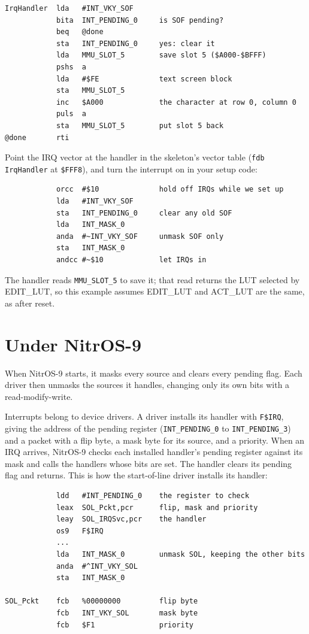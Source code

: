 \begin{verbatim}
IrqHandler  lda   #INT_VKY_SOF
            bita  INT_PENDING_0     is SOF pending?
            beq   @done
            sta   INT_PENDING_0     yes: clear it
            lda   MMU_SLOT_5        save slot 5 ($A000-$BFFF)
            pshs  a
            lda   #$FE              text screen block
            sta   MMU_SLOT_5
            inc   $A000             the character at row 0, column 0
            puls  a
            sta   MMU_SLOT_5        put slot 5 back
@done       rti
\end{verbatim}

Point the IRQ vector at the handler in the skeleton's vector table (\verb+fdb IrqHandler+ at \verb+$FFF8+), and turn the interrupt on in your setup code:

\begin{verbatim}
            orcc  #$10              hold off IRQs while we set up
            lda   #INT_VKY_SOF
            sta   INT_PENDING_0     clear any old SOF
            lda   INT_MASK_0
            anda  #~INT_VKY_SOF     unmask SOF only
            sta   INT_MASK_0
            andcc #~$10             let IRQs in
\end{verbatim}

The handler reads \verb+MMU_SLOT_5+ to save it; that read returns the LUT selected by EDIT\_LUT, so this example assumes EDIT\_LUT and ACT\_LUT are the same, as after reset.

\section{Under NitrOS-9}
\label{sec:int_nos9}

When NitrOS-9 starts, it masks every source and clears every pending flag. Each driver then unmasks the sources it handles, changing only its own bits with a read-modify-write.

Interrupts belong to device drivers. A driver installs its handler with \verb+F$IRQ+, giving the address of the pending register (\verb+INT_PENDING_0+ to \verb+INT_PENDING_3+) and a packet with a flip byte, a mask byte for its source, and a priority. When an IRQ arrives, NitrOS-9 checks each installed handler's pending register against its mask and calls the handlers whose bits are set. The handler clears its pending flag and returns. This is how the start-of-line driver installs its handler:

\begin{verbatim}
            ldd   #INT_PENDING_0    the register to check
            leax  SOL_Pckt,pcr      flip, mask and priority
            leay  SOL_IRQSvc,pcr    the handler
            os9   F$IRQ
            ...
            lda   INT_MASK_0        unmask SOL, keeping the other bits
            anda  #^INT_VKY_SOL
            sta   INT_MASK_0

SOL_Pckt    fcb   %00000000         flip byte
            fcb   INT_VKY_SOL       mask byte
            fcb   $F1               priority
\end{verbatim}

